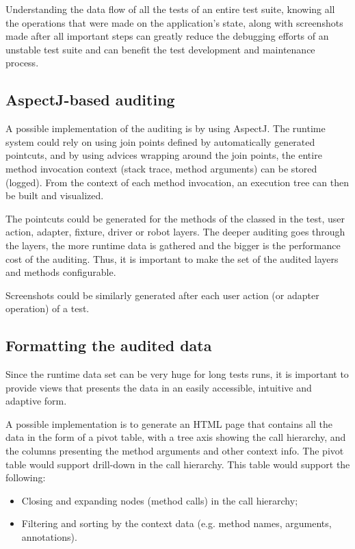 Understanding the data flow of all the tests of an entire test suite, knowing all the operations that were made on the application's state, along with screenshots made after all important steps can greatly reduce the debugging efforts of an unstable test suite and can benefit the test development and maintenance process.

\subsection {AspectJ-based auditing}

A possible implementation of the auditing is by using AspectJ. The runtime system could rely on using join points defined by automatically generated pointcuts, and by using advices wrapping around the join points, the entire method invocation context (stack trace, method arguments) can be stored (logged). \cite{AOPwiki} From the context of each method invocation, an execution tree can then be built and visualized.

The pointcuts could be generated for the methods of the classed in the test, user action, adapter, fixture, driver or robot layers. The deeper auditing goes through the layers, the more runtime data is gathered and the bigger is the performance cost of the auditing. Thus, it is important to make the set of the audited layers and methods configurable.

Screenshots could be similarly generated after each user action (or adapter operation) of a test.

\subsection {Formatting the audited data}

Since the runtime data set can be very huge for long tests runs, it is important to provide views that presents the data in an easily accessible, intuitive and adaptive form. 

A possible implementation is to generate an HTML page that contains all the data in the form of a pivot table, with a tree axis showing the call hierarchy, and the columns presenting the method arguments and other context info. The pivot table would support drill-down in the call hierarchy. This table would support the following:
\begin{itemize}
\item Closing and expanding nodes (method calls) in the call hierarchy;
\item Filtering and sorting by the context data (e.g. method names, arguments, annotations).
\end{itemize}

